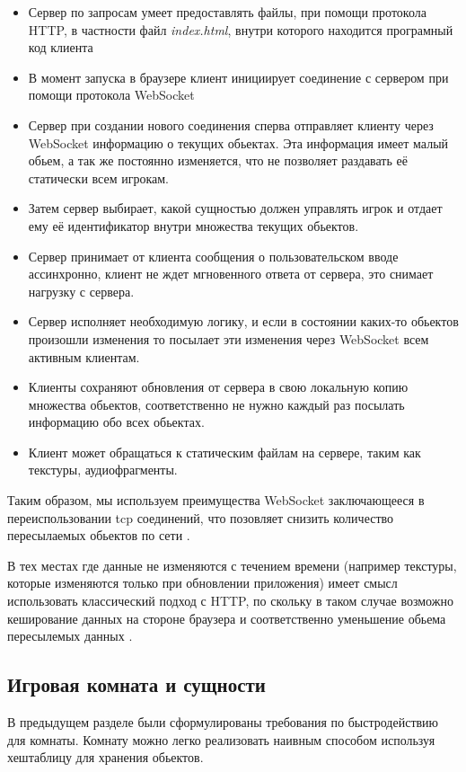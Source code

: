 \documentclass[a4paper,14pt, openany]{book}
\begin{document}
\begin{itemize}
   \item Сервер по запросам умеет предоставлять файлы, при помощи протокола HTTP, в частности файл \emph{index.html}, внутри которого находится програмный код клиента
   \item В момент запуска в браузере клиент инициирует соединение с сервером при помощи протокола WebSocket
   \item Сервер при создании нового соединения сперва отправляет клиенту через WebSocket информацию о текущих обьектах. Эта информация имеет малый обьем, а так же постоянно изменяется, что не позволяет раздавать её статически всем игрокам.
    \item Затем сервер выбирает, какой сущностью должен управлять игрок и отдает ему её идентификатор внутри множества текущих обьектов.
    \item Сервер принимает от клиента сообщения о пользовательском вводе ассинхронно, клиент не ждет мгновенного ответа от сервера, это снимает нагрузку с сервера.
    \item Сервер исполняет необходимую логику, и если в состоянии каких-то обьектов произошли изменения то посылает эти изменения через WebSocket всем активным клиентам.
    \item Клиенты сохраняют обновления от сервера в свою локальную копию множества обьектов, соответственно не нужно каждый раз посылать информацию обо всех обьектах.
    \item Клиент может обращаться к статическим файлам на сервере, таким как текстуры, аудиофрагменты.
\end{itemize}

Таким образом, мы используем преимущества WebSocket заключающееся в переиспользовании tcp соединений, что позовляет снизить количество пересылаемых обьектов по сети \cite{websocketbook}. 

В тех местах где данные не изменяются с течением времени (например текстуры, которые изменяются только при обновлении приложения) имеет смысл использовать классический подход с HTTP, по скольку в таком случае возможно кеширование данных на стороне браузера и соответственно уменьшение обьема пересылемых данных \cite{websocketvshttp}.


\subsection{Игровая комната и сущности}

В предыдущем разделе были сформулированы требования по быстродействию для комнаты. Комнату можно легко реализовать наивным способом используя хештаблицу для хранения обьектов. 
\end{document}
